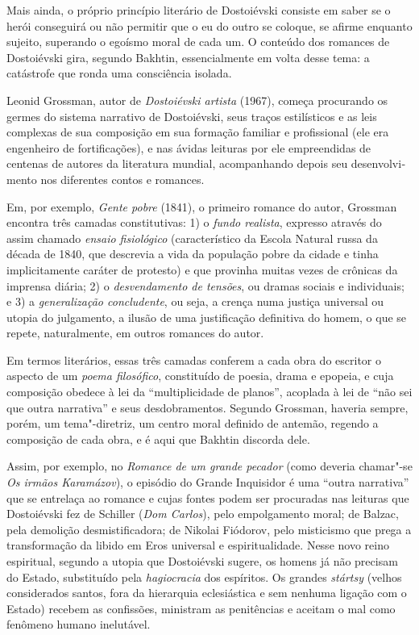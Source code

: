 Mais ainda, o próprio princípio literário de Dostoiévski consiste em
saber se o herói conseguirá ou não permitir que o eu do outro se
coloque, se afirme enquanto sujeito, superando o egoísmo moral de cada
um. O conteúdo dos romances de Dostoiévski gira, segundo Bakhtin,
essencialmente em volta desse tema: a catástrofe que ronda uma
consciência isolada.

Leonid Grossman, autor de \emph{Dostoiévski artista} (1967), começa
procurando os germes do sistema narrativo de Dostoiévski, seus traços
estilísticos e as leis complexas de sua composição em sua formação
familiar e profissional (ele era engenheiro de fortificações), e nas
ávidas leituras por ele empreendidas de centenas de autores da
literatura mundial, acompanhando depois seu desenvolvi­mento nos
diferentes contos e romances.

Em, por exemplo, \emph{Gente pobre} (1841), o primeiro romance do autor,
Grossman encontra três camadas constitutivas: 1) o \emph{fundo
realista}, expresso através do assim chamado \emph{ensaio fisiológico}
(característico da Escola Natural russa da década de 1840, que descrevia
a vida da população pobre da cidade e tinha implicitamente caráter de
protesto) e que provi­nha muitas vezes de crônicas da imprensa diária;
2) o \emph{desvendamento de tensões}, ou dramas sociais e individuais; e
3) a \emph{generalização concludente}, ou seja, a crença numa justiça
universal ou utopia do julgamento, a ilusão de uma justificação
definitiva do homem, o que se repete, natural­mente, em outros romances
do autor.

Em termos literários, essas três camadas confe­rem a cada obra do
escritor o aspecto de um \emph{poema filosófico}, constituído de poesia,
drama e epopeia, e cuja composição obedece à lei da ``multiplicidade de
planos'', acoplada à lei de ``não sei que outra narrativa'' e seus
desdobramentos. Segundo Grossman, haveria sempre, porém, um
tema"-diretriz, um centro moral definido de antemão, regendo a composição
de cada obra, e é aqui que Bakhtin discorda dele.

Assim, por exemplo, no \emph{Romance de um grande pecador} (como deveria
chamar"-se \emph{Os irmãos Karamázov}), o episódio do Grande
Inquisidor é uma ``outra narrativa'' que se entrelaça ao romance e cujas
fontes podem ser procuradas nas leituras que Dostoiévski fez de Schiller
(\emph{Dom Carlos}), pelo empolgamento moral; de Balzac, pela
demolição desmistificadora; de Nikolai Fiódorov, pelo misticismo que
prega a transformação da libido em Eros universal e espiritualidade.
Nesse novo reino espiritual, segundo a utopia que Dostoiévski sugere, os
homens já não precisam do Estado, substituído pela \emph{hagiocracia}
dos espíritos. Os grandes \emph{stártsy} (velhos considerados santos,
fora da hierarquia eclesiástica e sem nenhuma ligação com o Estado)
recebem as confissões, ministram as penitências e aceitam o mal como
fenômeno humano inelutável.

